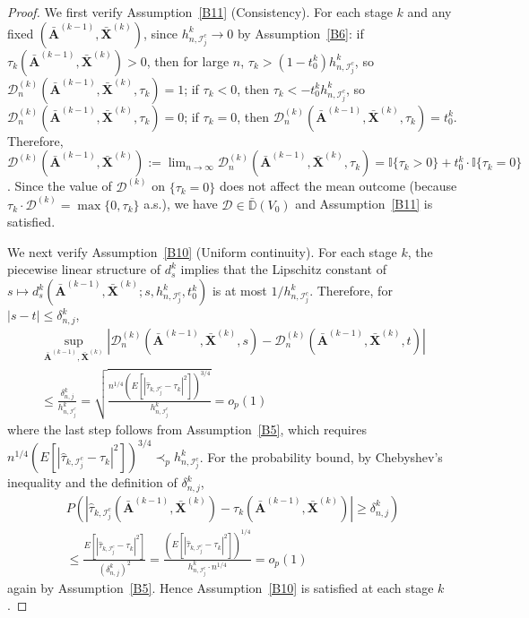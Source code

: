 \documentclass[11pt]{article}
\theoremstyle{referenceplain}
\theoremstyle{referencedefinition}
\theoremstyle{referenceremark}
\begin{document}
\begin{proof}
We first verify Assumption~\ref{B11} (Consistency). For each stage $k$ and any fixed $(\bar{\mathbf{A}}^{(k-1)},\bar{\mathbf{X}}^{(k)})$, since $h_{n,\mathcal{I}_j^c}^k\to 0$ by Assumption~\ref{B6}: if $\tau_k(\bar{\mathbf{A}}^{(k-1)},\bar{\mathbf{X}}^{(k)})>0$, then for large $n$, $\tau_k>(1-t_0^k)h_{n,\mathcal{I}_j^c}^k$, so $\mathcal{D}_n^{(k)}(\bar{\mathbf{A}}^{(k-1)},\bar{\mathbf{X}}^{(k)},\tau_k)=1$; if $\tau_k<0$, then $\tau_k<-t_0^k h_{n,\mathcal{I}_j^c}^k$, so $\mathcal{D}_n^{(k)}(\bar{\mathbf{A}}^{(k-1)},\bar{\mathbf{X}}^{(k)},\tau_k)=0$; if $\tau_k=0$, then $\mathcal{D}_n^{(k)}(\bar{\mathbf{A}}^{(k-1)},\bar{\mathbf{X}}^{(k)},\tau_k)=t_0^k$. Therefore, $\mathcal{D}^{(k)}(\bar{\mathbf{A}}^{(k-1)},\bar{\mathbf{X}}^{(k)}):=\lim_{n\to\infty}\mathcal{D}_n^{(k)}(\bar{\mathbf{A}}^{(k-1)},\bar{\mathbf{X}}^{(k)},\tau_k)=\mathbb{I}\{\tau_k>0\}+t_0^k\cdot\mathbb{I}\{\tau_k=0\}$. Since the value of $\mathcal{D}^{(k)}$ on $\{\tau_k=0\}$ does not affect the mean outcome (because $\tau_k\cdot\mathcal{D}^{(k)}=\max\{0,\tau_k\}$ a.s.), we have $\mathcal{D}\in\bar{\mathbb{D}}(V_0)$ and Assumption~\ref{B11} is satisfied.

We next verify Assumption~\ref{B10} (Uniform continuity). For each stage $k$, the piecewise linear structure of $d_s^k$ implies that the Lipschitz constant of $s\mapsto d_s^k(\bar{\mathbf{A}}^{(k-1)},\bar{\mathbf{X}}^{(k)};s,h_{n,\mathcal{I}_j^c}^k,t_0^k)$ is at most $1/h_{n,\mathcal{I}_j^c}^k$. Therefore, for $|s-t|\leq{\delta_{n,j}^k}$,
\begin{align*}
    \sup_{\bar{\mathbf{A}}^{(k-1)},\bar{\mathbf{X}}^{(k)}}
    |\mathcal{D}_n^{(k)}(\bar{\mathbf{A}}^{(k-1)},
    \bar{\mathbf{X}}^{(k)},s)
    -\mathcal{D}_n^{(k)}(\bar{\mathbf{A}}^{(k-1)},
    \bar{\mathbf{X}}^{(k)},t)|
    \\\leq \frac{{\delta_{n,j}^k}}{h_{n,\mathcal{I}_j^c}^k}
    =\sqrt{\frac{n^{1/4}(E[|\widehat{\tau}_{k,\mathcal{I}_j^c}
    -\tau_k|^2])^{3/4}}{h_{n,\mathcal{I}_j^c}^k}}
    =o_p(1)
\end{align*}
where the last step follows from Assumption~\ref{B5}, which requires $n^{1/4}(E[|\widehat{\tau}_{k,{\mathcal{I}_j^c}}-\tau_k|^2])^{3/4}\prec_p h_{n,{\mathcal{I}_j^c}}^k$. For the probability bound, by Chebyshev's inequality and the definition of ${\delta_{n,j}^k}$,
\begin{align*}
    P\!\left(|\widehat{\tau}_{k,\mathcal{I}_j^c}
    (\bar{\mathbf{A}}^{(k-1)},\bar{\mathbf{X}}^{(k)})
    -\tau_k(\bar{\mathbf{A}}^{(k-1)},\bar{\mathbf{X}}^{(k)})|
    \geq{\delta_{n,j}^k}\right)\\
    \leq\frac{E[|\widehat{\tau}_{k,\mathcal{I}_j^c}-\tau_k|^2]}
    {({\delta_{n,j}^k})^2}
    =\frac{(E[|\widehat{\tau}_{k,\mathcal{I}_j^c}-\tau_k|^2])^{1/4}}
    {h_{n,\mathcal{I}_j^c}^k\cdot n^{1/4}}=o_p(1)
\end{align*}
again by Assumption~\ref{B5}. Hence Assumption~\ref{B10} is satisfied at each stage $k$.


\end{proof}
\end{document}
